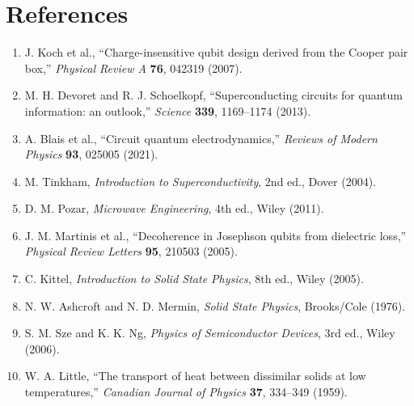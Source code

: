 \documentclass[11pt]{article}
\begin{document}
\section{References}
\begin{enumerate}[leftmargin=1.5em]
    \item J. Koch et al., ``Charge-insensitive qubit design derived from the Cooper pair box,'' \emph{Physical Review A} \textbf{76}, 042319 (2007).
    \item M. H. Devoret and R. J. Schoelkopf, ``Superconducting circuits for quantum information: an outlook,'' \emph{Science} \textbf{339}, 1169--1174 (2013).
    \item A. Blais et al., ``Circuit quantum electrodynamics,'' \emph{Reviews of Modern Physics} \textbf{93}, 025005 (2021).
    \item M. Tinkham, \emph{Introduction to Superconductivity}, 2nd ed., Dover (2004).
    \item D. M. Pozar, \emph{Microwave Engineering}, 4th ed., Wiley (2011).
    \item J. M. Martinis et al., ``Decoherence in Josephson qubits from dielectric loss,'' \emph{Physical Review Letters} \textbf{95}, 210503 (2005).
    \item C. Kittel, \emph{Introduction to Solid State Physics}, 8th ed., Wiley (2005).
    \item N. W. Ashcroft and N. D. Mermin, \emph{Solid State Physics}, Brooks/Cole (1976).
    \item S. M. Sze and K. K. Ng, \emph{Physics of Semiconductor Devices}, 3rd ed., Wiley (2006).
    \item W. A. Little, ``The transport of heat between dissimilar solids at low temperatures,'' \emph{Canadian Journal of Physics} \textbf{37}, 334--349 (1959).
\end{enumerate}
\end{document}
